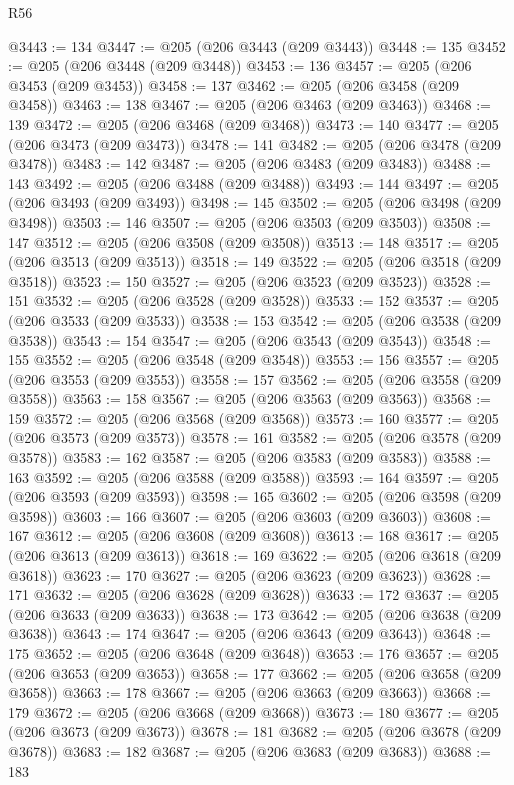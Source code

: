 \begin{lexlean}{R56}
\begin{coremodule}
{{{{{{{{{{{{{{{{{{{{{{{{{{{{{{{{{{{{{{{{{{{{{{{{{{{{{{{{{{{{{{{{{{{{{{{{{{{{{{{{{{{{{{{{{{{{{{{{{{{{{{{{{{{{{{{{{{{{{{{{{{{{{{{{{{{{{{{{{{{{{{{{{{{{{{{{{{{{{{{{{{{{{{{{{{{{{{{{{{{{{{{{{{{{{{{{{{{{{{{{{{{{{{{{{{{@3443 := 134
@3447 := @205 (@206 @3443 (@209 @3443))
@3448 := 135
@3452 := @205 (@206 @3448 (@209 @3448))
@3453 := 136
@3457 := @205 (@206 @3453 (@209 @3453))
@3458 := 137
@3462 := @205 (@206 @3458 (@209 @3458))
@3463 := 138
@3467 := @205 (@206 @3463 (@209 @3463))
@3468 := 139
@3472 := @205 (@206 @3468 (@209 @3468))
@3473 := 140
@3477 := @205 (@206 @3473 (@209 @3473))
@3478 := 141
@3482 := @205 (@206 @3478 (@209 @3478))
@3483 := 142
@3487 := @205 (@206 @3483 (@209 @3483))
@3488 := 143
@3492 := @205 (@206 @3488 (@209 @3488))
@3493 := 144
@3497 := @205 (@206 @3493 (@209 @3493))
@3498 := 145
@3502 := @205 (@206 @3498 (@209 @3498))
@3503 := 146
@3507 := @205 (@206 @3503 (@209 @3503))
@3508 := 147
@3512 := @205 (@206 @3508 (@209 @3508))
@3513 := 148
@3517 := @205 (@206 @3513 (@209 @3513))
@3518 := 149
@3522 := @205 (@206 @3518 (@209 @3518))
@3523 := 150
@3527 := @205 (@206 @3523 (@209 @3523))
@3528 := 151
@3532 := @205 (@206 @3528 (@209 @3528))
@3533 := 152
@3537 := @205 (@206 @3533 (@209 @3533))
@3538 := 153
@3542 := @205 (@206 @3538 (@209 @3538))
@3543 := 154
@3547 := @205 (@206 @3543 (@209 @3543))
@3548 := 155
@3552 := @205 (@206 @3548 (@209 @3548))
@3553 := 156
@3557 := @205 (@206 @3553 (@209 @3553))
@3558 := 157
@3562 := @205 (@206 @3558 (@209 @3558))
@3563 := 158
@3567 := @205 (@206 @3563 (@209 @3563))
@3568 := 159
@3572 := @205 (@206 @3568 (@209 @3568))
@3573 := 160
@3577 := @205 (@206 @3573 (@209 @3573))
@3578 := 161
@3582 := @205 (@206 @3578 (@209 @3578))
@3583 := 162
@3587 := @205 (@206 @3583 (@209 @3583))
@3588 := 163
@3592 := @205 (@206 @3588 (@209 @3588))
@3593 := 164
@3597 := @205 (@206 @3593 (@209 @3593))
@3598 := 165
@3602 := @205 (@206 @3598 (@209 @3598))
@3603 := 166
@3607 := @205 (@206 @3603 (@209 @3603))
@3608 := 167
@3612 := @205 (@206 @3608 (@209 @3608))
@3613 := 168
@3617 := @205 (@206 @3613 (@209 @3613))
@3618 := 169
@3622 := @205 (@206 @3618 (@209 @3618))
@3623 := 170
@3627 := @205 (@206 @3623 (@209 @3623))
@3628 := 171
@3632 := @205 (@206 @3628 (@209 @3628))
@3633 := 172
@3637 := @205 (@206 @3633 (@209 @3633))
@3638 := 173
@3642 := @205 (@206 @3638 (@209 @3638))
@3643 := 174
@3647 := @205 (@206 @3643 (@209 @3643))
@3648 := 175
@3652 := @205 (@206 @3648 (@209 @3648))
@3653 := 176
@3657 := @205 (@206 @3653 (@209 @3653))
@3658 := 177
@3662 := @205 (@206 @3658 (@209 @3658))
@3663 := 178
@3667 := @205 (@206 @3663 (@209 @3663))
@3668 := 179
@3672 := @205 (@206 @3668 (@209 @3668))
@3673 := 180
@3677 := @205 (@206 @3673 (@209 @3673))
@3678 := 181
@3682 := @205 (@206 @3678 (@209 @3678))
@3683 := 182
@3687 := @205 (@206 @3683 (@209 @3683))
@3688 := 183
}}}}}}}}}}}}}}}}}}}}}}}}}}}}}}}}}}}}}}}}}}}}}}}}}}}}}}}}}}}}}}}}}}}}}}}}}}}}}}}}}}}}}}}}}}}}}}}}}}}}}}}}}}}}}}}}}}}}}}}}}}}}}}}}}}}}}}}}}}}}}}}}}}}}}}}}}}}}}}}}}}}}}}}}}}}}}}}}}}}}}}}}}}}}}}}}}}}}}}}}}}}}}}}}}}}
\end{coremodule}
\end{lexlean}
